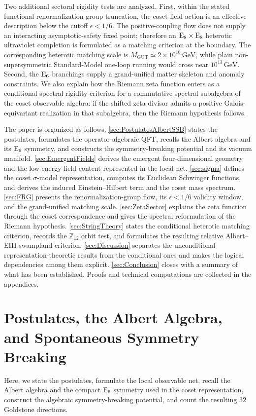 \documentclass[pdflatex,sn-mathphys-num]{sn-jnl}
\theoremstyle{thmstyleone}
\theoremstyle{thmstylethree}%
\theoremstyle{thmstyletwo}%
\begin{document}
Two additional sectoral rigidity tests are analyzed. First, within the stated
functional renormalization-group truncation, the coset-field action is an
effective description below the cutoff \(\epsilon<1/6\). The positive-coupling
flow does not supply an interacting asymptotic-safety fixed point; therefore an
$\mathrm{E}_{8}\times \mathrm{E}_{8}$ heterotic ultraviolet completion is formulated as a
matching criterion at the boundary. The corresponding heterotic matching scale
is \(M_{\mathrm{GUT}}\simeq2\times10^{16}\,\mathrm{GeV}\), while plain
non-supersymmetric Standard-Model one-loop running would cross near
\(10^{13}\,\mathrm{GeV}\). Second, the $\mathrm{E}_{6}$ branchings supply a
grand-unified matter skeleton and anomaly constraints. We also explain how the
Riemann zeta function enters as a conditional spectral rigidity criterion for a
commutative spectral subalgebra of the coset observable algebra: if the shifted
zeta divisor admits a positive Galois-equivariant realization in that
subalgebra, then the Riemann hypothesis follows.

The paper is organized as follows. \autoref{sec:PostulatesAlbertSSB} states the
postulates, formulates the operator-algebraic QFT, recalls the Albert algebra and
its $\mathrm{E}_{6}$ symmetry, and constructs the symmetry-breaking potential and its
vacuum manifold.
\autoref{sec:EmergentFields} derives the emergent four-dimensional geometry and
the low-energy field content represented in the local net. \autoref{sec:sigma}
defines the coset $\sigma$-model representation, computes its Euclidean
Schwinger functions, and derives the induced Einstein--Hilbert term and the
coset mass spectrum. \autoref{sec:FRG} presents the renormalization-group flow,
its \(\epsilon<1/6\) validity window, and the grand-unified matching scale.
\autoref{sec:ZetaSector} explains the zeta function through the coset
correspondence and gives the spectral reformulation of the Riemann hypothesis.
\autoref{sec:StringTheory} states the conditional heterotic matching criterion,
records the $\mathbb Z_{12}$ orbit test, and formulates the resulting relative
Albert--EIII swampland criterion.
\autoref{sec:Discussion} separates the unconditional representation-theoretic
results from the conditional ones and makes the logical dependencies among
them explicit. \autoref{sec:Conclusion} closes with a summary of what has been established.
Proofs and technical computations are collected in the appendices.

\section{Postulates, the Albert Algebra, and Spontaneous Symmetry Breaking}
\label{sec:PostulatesAlbertSSB}
Here, we state the postulates, formulate the local observable net, recall
the Albert algebra and the compact $\mathrm{E}_{6}$ symmetry used in the coset
representation, construct the algebraic symmetry-breaking potential, and
count the resulting $32$ Goldstone directions.
\end{document}
